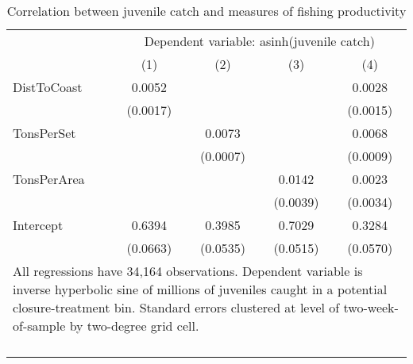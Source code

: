 \begin{table}[tb]
\centering
\caption{Correlation between juvenile catch and measures of fishing productivity} 
\label{balance_relevantvariables}
\begin{tabular}{lcccc}
   \toprule & \multicolumn{4}{c}{Dependent variable: asinh(juvenile catch)} \\  & (1) & (2) & (3) & (4) \\ 
   \midrule DistToCoast & 0.0052 &  &  & 0.0028 \\ 
   & (0.0017) &  &  & (0.0015) \\ 
  TonsPerSet &  & 0.0073 &  & 0.0068 \\ 
   &  & (0.0007) &  & (0.0009) \\ 
  TonsPerArea &  &  & 0.0142 & 0.0023 \\ 
   &  &  & (0.0039) & (0.0034) \\ 
  Intercept & 0.6394 & 0.3985 & 0.7029 & 0.3284 \\ 
   & (0.0663) & (0.0535) & (0.0515) & (0.0570) \\ 
   \bottomrule \multicolumn{5}{l}{\multirow{2}{10.4cm}{All regressions have 34,164 observations. Dependent variable is inverse hyperbolic sine of millions of juveniles caught in a potential closure-treatment bin. Standard errors clustered at level of two-week-of-sample by two-degree grid cell.}} \\\\\\\\\\\\ \end{tabular}
\end{table}
